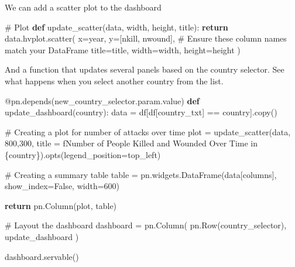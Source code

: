 \documentclass[
  letterpaper,
  DIV=11,
  numbers=noendperiod]{scrreprt}
\newenvironment{Shaded}{\begin{snugshade}}{\end{snugshade}}
\newcommand{\AttributeTok}[1]{\textcolor[rgb]{0.40,0.45,0.13}{#1}}
\newcommand{\CommentTok}[1]{\textcolor[rgb]{0.37,0.37,0.37}{#1}}
\newcommand{\ControlFlowTok}[1]{\textcolor[rgb]{0.00,0.23,0.31}{\textbf{#1}}}
\newcommand{\DecValTok}[1]{\textcolor[rgb]{0.68,0.00,0.00}{#1}}
\newcommand{\KeywordTok}[1]{\textcolor[rgb]{0.00,0.23,0.31}{\textbf{#1}}}
\newcommand{\NormalTok}[1]{\textcolor[rgb]{0.00,0.23,0.31}{#1}}
\newcommand{\OperatorTok}[1]{\textcolor[rgb]{0.37,0.37,0.37}{#1}}
\newcommand{\SpecialCharTok}[1]{\textcolor[rgb]{0.37,0.37,0.37}{#1}}
\newcommand{\SpecialStringTok}[1]{\textcolor[rgb]{0.13,0.47,0.30}{#1}}
\newcommand{\StringTok}[1]{\textcolor[rgb]{0.13,0.47,0.30}{#1}}
\newcommand{\VariableTok}[1]{\textcolor[rgb]{0.07,0.07,0.07}{#1}}
\begin{document}
We can add a scatter plot to the dashboard

\begin{Shaded}
\begin{Highlighting}[]
\CommentTok{\# Plot}
\KeywordTok{def}\NormalTok{ update\_scatter(data, width, height, title):}
        \ControlFlowTok{return}\NormalTok{ data.hvplot.scatter(}
\NormalTok{        x}\OperatorTok{=}\StringTok{\textquotesingle{}year\textquotesingle{}}\NormalTok{, }
\NormalTok{        y}\OperatorTok{=}\NormalTok{[}\StringTok{\textquotesingle{}nkill\textquotesingle{}}\NormalTok{, }\StringTok{\textquotesingle{}nwound\textquotesingle{}}\NormalTok{],  }\CommentTok{\# Ensure these column names match your DataFrame}
\NormalTok{        title}\OperatorTok{=}\NormalTok{title,}
\NormalTok{        width}\OperatorTok{=}\NormalTok{width,}
\NormalTok{        height}\OperatorTok{=}\NormalTok{height}
\NormalTok{    )}
\end{Highlighting}
\end{Shaded}

And a function that updates several panels based on the country
selector. See what happens when you select another country from the
list.

\begin{Shaded}
\begin{Highlighting}[]
\AttributeTok{@pn.depends}\NormalTok{(new\_country\_selector.param.value)}
\KeywordTok{def}\NormalTok{ update\_dashboard(country):}
\NormalTok{    data }\OperatorTok{=}\NormalTok{ df[df[}\StringTok{\textquotesingle{}country\_txt\textquotesingle{}}\NormalTok{] }\OperatorTok{==}\NormalTok{ country].copy()}
    
    \CommentTok{\# Creating a plot for number of attacks over time}
\NormalTok{    plot }\OperatorTok{=}\NormalTok{ update\_scatter(data, }\DecValTok{800}\NormalTok{,}\DecValTok{300}\NormalTok{, }
\NormalTok{                          title }\OperatorTok{=} \SpecialStringTok{f\textquotesingle{}Number of People Killed and Wounded Over Time in }\SpecialCharTok{\{}\NormalTok{country}\SpecialCharTok{\}}\SpecialStringTok{\textquotesingle{}}\NormalTok{).opts(legend\_position}\OperatorTok{=}\StringTok{\textquotesingle{}top\_left\textquotesingle{}}\NormalTok{)}
    
    \CommentTok{\# Creating a summary table}
\NormalTok{    table }\OperatorTok{=}\NormalTok{ pn.widgets.DataFrame(data[columns], show\_index}\OperatorTok{=}\VariableTok{False}\NormalTok{, width}\OperatorTok{=}\DecValTok{600}\NormalTok{)}
    
    \ControlFlowTok{return}\NormalTok{ pn.Column(plot, table)}

\CommentTok{\# Layout the dashboard}
\NormalTok{dashboard }\OperatorTok{=}\NormalTok{ pn.Column(}
\NormalTok{    pn.Row(country\_selector),}
\NormalTok{    update\_dashboard}
\NormalTok{)}

\NormalTok{dashboard.servable()}
\end{Highlighting}
\end{Shaded}
\end{document}
